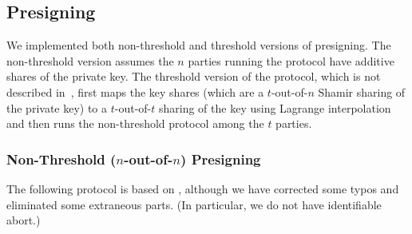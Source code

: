 \documentclass[11pt]{article}
\newcommand{\?}[1]{\stackrel{?}{#1}}
\begin{document}
\subsection{Presigning}
\label{sec:presigning}

We implemented both non-threshold and threshold versions of presigning. 
The non-threshold version assumes the $n$ parties running the protocol have additive shares of the private key. 
The threshold version of the protocol, which is not described in~\cite{cggmp21}, first maps the key shares (which are a $t$-out-of-$n$ Shamir sharing of the private key) to a $t$-out-of-$t$ sharing of the key using Lagrange interpolation and then runs the non-threshold protocol among the $t$ parties.



\subsubsection{Non-Threshold ($n$-out-of-$n$) Presigning} \label{section:orig-presigning}

The following protocol is based on \cite[Figure~7]{cggmp21}, although we have corrected some typos and eliminated some extraneous parts. (In particular, we do not have identifiable abort.)
\end{document}
